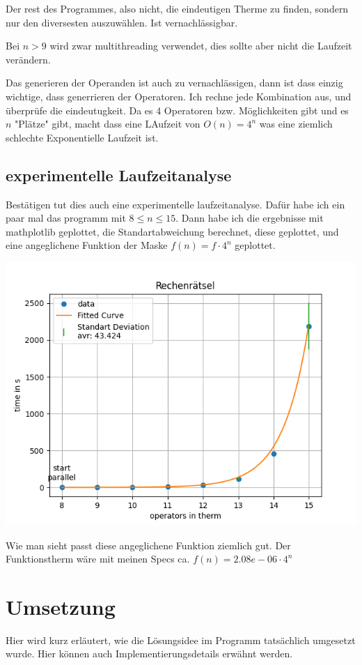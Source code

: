 \documentclass[a4paper,10pt,ngerman]{scrartcl}
\begin{document}
Der rest des Programmes, also nicht, die eindeutigen Therme zu finden, sondern nur den diversesten auszuwählen. Ist vernachlässigbar.

Bei $n > 9$ wird zwar multithreading verwendet, dies sollte aber nicht die Laufzeit verändern.

Das generieren der Operanden ist auch zu vernachlässigen, dann ist dass einzig wichtige, dass generrieren der Operatoren. Ich rechne jede Kombination aus, und überprüfe die eindeutugkeit. Da es 4 Operatoren bzw. Möglichkeiten gibt und es $n$ "Plätze" gibt, macht dass eine LAufzeit von $O(n) = 4^n$ was eine ziemlich schlechte Exponentielle Laufzeit ist.

\subsection{experimentelle Laufzeitanalyse}

Bestätigen tut dies auch eine experimentelle laufzeitanalyse. Dafür habe ich ein paar mal das programm mit $8 \leq n \leq 15$. Dann habe ich die ergebnisse mit mathplotlib geplottet, die Standartabweichung berechnet, diese geplottet, und eine angeglichene Funktion der Maske $f(n) = f \cdot 4^n$ geplottet.

\includegraphics[width=\textwidth]{Laufzeit.png}

Wie man sieht passt diese angeglichene Funktion ziemlich gut. Der Funktionstherm wäre mit meinen Specs ca. $f(n) = 2.08e-06 \cdot 4^n$


\section{Umsetzung}
Hier wird kurz erläutert, wie die Lösungsidee im Programm tatsächlich umgesetzt wurde. Hier können auch Implementierungsdetails erwähnt werden.
\end{document}
